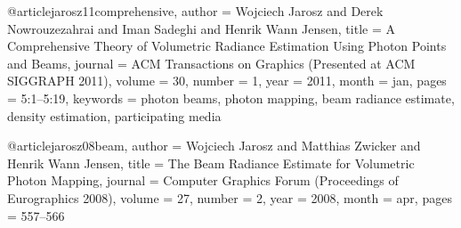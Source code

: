 @article{jarosz11comprehensive,
    author = {Wojciech Jarosz and Derek Nowrouzezahrai and Iman Sadeghi and Henrik Wann Jensen},
    title = {A Comprehensive Theory of Volumetric Radiance Estimation Using Photon Points and Beams},
    journal = {ACM Transactions on Graphics (Presented at ACM SIGGRAPH 2011)},
    volume = {30},
    number = {1},
    year = {2011},
    month = jan,
    pages = {5:1--5:19},
    keywords = {photon beams, photon mapping, beam radiance estimate, density estimation, participating media}
}

@article{jarosz08beam,
    author = {Wojciech Jarosz and Matthias Zwicker and Henrik Wann Jensen},
    title = {The Beam Radiance Estimate for Volumetric Photon Mapping},
    journal = {Computer Graphics Forum (Proceedings of Eurographics 2008)},
    volume = {27},
    number = {2},
    year = {2008},
    month = apr,
    pages = {557--566}
}
